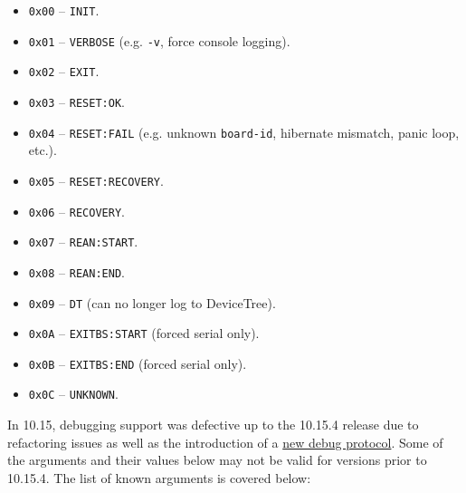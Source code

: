 \documentclass[]{article}
\providecommand{\tightlist}{%
  \setlength{\itemsep}{0pt}\setlength{\parskip}{0pt}}
\begin{document}
\begin{itemize}
  \begin{itemize}
  \tightlist
  \item \texttt{0x00} -- \texttt{INIT}.
  \item \texttt{0x01} -- \texttt{VERBOSE} (e.g. \texttt{-v}, force console logging).
  \item \texttt{0x02} -- \texttt{EXIT}.
  \item \texttt{0x03} -- \texttt{RESET:OK}.
  \item \texttt{0x04} -- \texttt{RESET:FAIL} (e.g. unknown \texttt{board-id}, hibernate mismatch, panic loop, etc.).
  \item \texttt{0x05} -- \texttt{RESET:RECOVERY}.
  \item \texttt{0x06} -- \texttt{RECOVERY}.
  \item \texttt{0x07} -- \texttt{REAN:START}.
  \item \texttt{0x08} -- \texttt{REAN:END}.
  \item \texttt{0x09} -- \texttt{DT} (can no longer log to DeviceTree).
  \item \texttt{0x0A} -- \texttt{EXITBS:START} (forced serial only).
  \item \texttt{0x0B} -- \texttt{EXITBS:END} (forced serial only).
  \item \texttt{0x0C} -- \texttt{UNKNOWN}.
  \end{itemize}

  In 10.15, debugging support was defective up to the 10.15.4 release due to
  refactoring issues as well as the introduction of a
  \href{https://github.com/acidanthera/OpenCorePkg/blob/master/Include/Apple/Protocol/AppleDebugLog.h}{new debug protocol}.
  Some of the arguments and their values below may not be valid for versions prior
  to 10.15.4. The list of known arguments is covered below:


\end{itemize}
\end{document}
